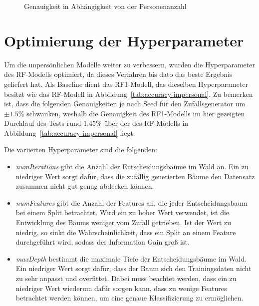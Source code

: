 \begin{figure}
\centering
{}
\caption{Genauigkeit in Abhängigkeit von der Personenanzahl}
\label{fig:accuracy-convergence}
\end{figure}

\section{Optimierung der Hyperparameter}
Um die unpersönlichen Modelle weiter zu verbessern, wurden die Hyperparameter des RF-Modells optimiert, da dieses Verfahren bis dato das beste Ergebnis geliefert hat. Als Baseline dient das RF1-Modell, das dieselben Hyperparameter besitzt wie das RF-Modell in Abbildung~\ref{tab:accuracy-impersonal}. Zu bemerken ist, dass die folgenden Genauigkeiten je nach Seed für den Zufallsgenerator um $\pm 1.5 \%$ schwanken, weshalb die Genauigkeit des RF1-Modells im hier gezeigten Durchlauf des Tests rund $1.45 \%$ über der des RF-Modells in Abbildung~\ref{tab:accuracy-impersonal} liegt.

Die variierten Hyperparameter sind die folgenden:

\begin{itemize}
	\item \textit{numIterations} gibt die Anzahl der Entscheidungsbäume im Wald an. Ein zu niedriger Wert sorgt dafür, dass die zufällig generierten Bäume den Datensatz zusammen nicht gut genug abdecken können.
	\item \textit{numFeatures} gibt die Anzahl der Features an, die jeder Entscheidungsbaum bei einem Split betrachtet. Wird ein zu hoher Wert verwendet, ist die Entwicklung des Baums weniger vom Zufall getrieben. Ist der Wert zu niedrig, so sinkt die Wahrscheinlichkeit, dass ein Split an einem Feature durchgeführt wird, sodass der Information Gain groß ist.
	\item \textit{maxDepth} bestimmt die maximale Tiefe der Entscheidungsbäume im Wald. Ein niedriger Wert sorgt dafür, dass der Baum sich den Trainingsdaten nicht zu sehr anpasst und overfittet. Dabei muss beachtet werden, dass ein zu niedriger Wert wiederum dafür sorgen kann, dass zu wenige Features betrachtet werden können, um eine genaue Klassifizierung zu ermöglichen.
\end{itemize}

